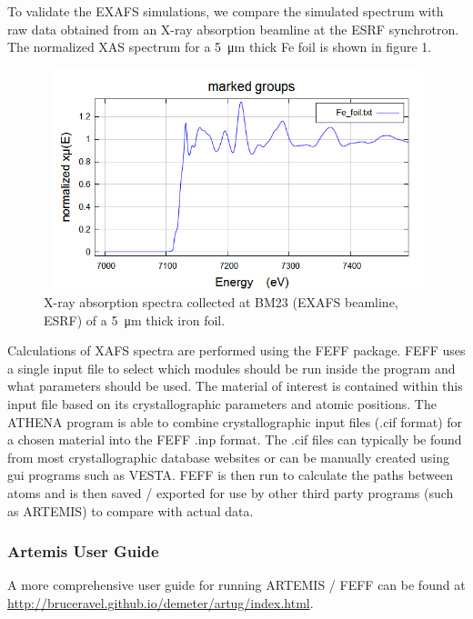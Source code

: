 To validate the EXAFS simulations, we compare the simulated spectrum with raw
data obtained from an X-ray absorption beamline at the ESRF synchrotron. The
normalized XAS spectrum for a \SI{5}{\micro\metre} thick Fe foil is shown in figure 1.
\begin{figure}
  \includegraphics[width=4.822in,height=2.528in]{figures/Task42210-img001.png}
  \caption{%
    X-ray absorption spectra collected at BM23 (EXAFS beamline, ESRF) of
    a \SI{5}{\micro\metre} thick iron foil.%
  }
  \label{fig:xafs_fig1}
\end{figure}
Calculations of XAFS spectra are performed using the FEFF package. FEFF uses a
single input file to select which modules should be run inside the program and
what parameters should be used. The material of interest is contained within
this input file based on its crystallographic parameters and atomic positions.
The ATHENA program is able to combine crystallographic input files (.cif format)
for a chosen material into the FEFF .inp format. The .cif files can typically be
found from most crystallographic database websites or can be manually created
using gui programs such as VESTA. FEFF is then run to calculate the paths
between atoms and is then saved / exported for use by other third party programs
(such as ARTEMIS) to compare with actual data.

\subsubsection{Artemis User Guide} A more comprehensive user guide for running ARTEMIS
/ FEFF can be found at
\href{http://bruceravel.github.io/demeter/artug/index.html}{http://bruceravel.github.io/demeter/artug/index.html}.

